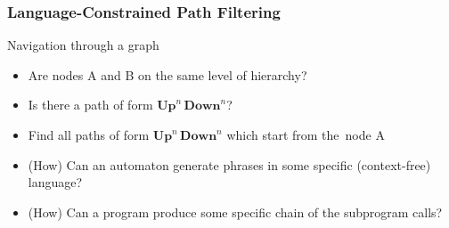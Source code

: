 \documentclass[xcolor=table]{beamer}
\begin{document}
\begin{frame}[fragile]
  \transwipe[direction=90]
  \frametitle{Language-Constrained Path Filtering}
  \begin{minipage}[m]{0.45\linewidth}
\end{minipage}\hfill
\begin{minipage}[m]{0.5\linewidth}
Navigation through a graph
\begin{itemize}
      \item Are nodes A and B on the same level of hierarchy?
      \item Is there a path of form $\textbf{Up}^n \, \textbf{Down}^n$?
      \item Find all paths of form $\textbf{Up}^n \, \textbf{Down}^n$ which start from the~node A
\end{itemize}

\end{minipage}

  \begin{itemize}
    \item (How) Can an automaton generate phrases in some specific (context-free) language?
    \item (How) Can a program produce some specific chain of the subprogram calls? 
  \end{itemize}
\end{frame}
\end{document}
